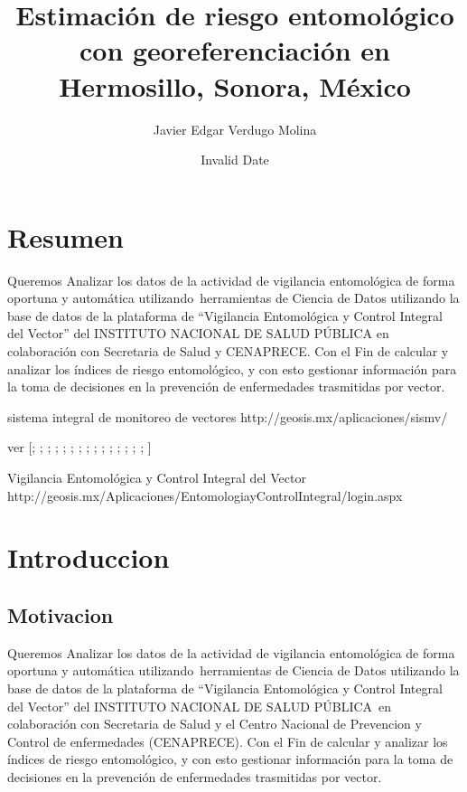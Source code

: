 \documentclass[
  letterpaper,
]{scrbook}
\title{Estimación de riesgo entomológico con georeferenciación en
Hermosillo, Sonora, México}
\author{Javier Edgar Verdugo Molina}
\date{Invalid Date}
\renewcommand*\contentsname{Table of contents}
\newcommand\contentsname{Table of contents}
\begin{document}
\frontmatter
\maketitle

\renewcommand*\contentsname{Contents}
{
\hypersetup{linkcolor=}
\setcounter{tocdepth}{1}
\tableofcontents
}
\mainmatter
{}

\chapter*{Resumen}\label{resumen}


Queremos Analizar los datos de la actividad de vigilancia entomológica
de forma oportuna y automática utilizando~herramientas de Ciencia de
Datos utilizando la base de datos de la plataforma de ``Vigilancia
Entomológica y Control Integral del Vector'' del INSTITUTO NACIONAL DE
SALUD PÚBLICA en colaboración con Secretaria de Salud y CENAPRECE. Con
el Fin de calcular y analizar los índices de riesgo entomológico, y con
esto gestionar información para la toma de decisiones en la prevención
de enfermedades trasmitidas por vector.

sistema integral de monitoreo de vectores
http://geosis.mx/aplicaciones/sismv/

ver {[}\textcite{GIORDANO2020}; \textcite{who2016zikasurvirus};
\textcite{Garjito2020}; \textcite{Quintero2015}; \textcite{Bowman2014};
\textcite{TunLin1996}; \textcite{Organization2016};
\textcite{SouthEastAsia.2011}; \textcite{Tedjou2020};
\textcite{Braks2003}; \textcite{Kamgang2010}; \textcite{Kamgang2013};
\textcite{Weetman2018}; \textcite{Tomia}; \textcite{Praptowibowo2015};
{]}

Vigilancia Entomológica y Control Integral del Vector
http://geosis.mx/Aplicaciones/EntomologiayControlIntegral/login.aspx


\chapter{Introduccion}\label{introduccion}

\section{Motivacion}\label{motivacion}

Queremos Analizar los datos de la actividad de vigilancia entomológica
de forma oportuna y automática utilizando~herramientas de Ciencia de
Datos utilizando la base de datos de la plataforma de ``Vigilancia
Entomológica y Control Integral del Vector'' del INSTITUTO NACIONAL DE
SALUD PÚBLICA~en colaboración con Secretaria de Salud y el Centro
Nacional de Prevencion y Control de enfermedades (CENAPRECE). Con el Fin
de calcular y analizar los índices de riesgo entomológico, y con esto
gestionar información para la toma de decisiones en la prevención de
enfermedades trasmitidas por vector.
\end{document}
